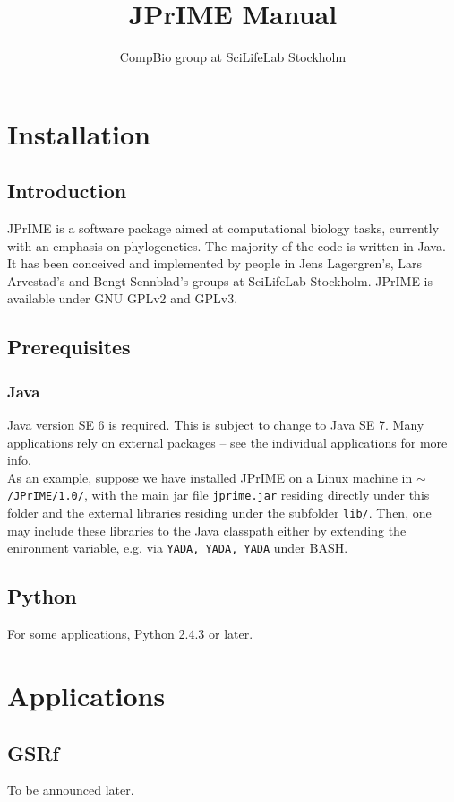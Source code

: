 \documentclass[]{report}   %
\begin{document}
\title{JPrIME Manual}   %
\author{CompBio group at SciLifeLab Stockholm}         %
\date{}    %
\maketitle


\chapter{Installation}
\section{Introduction}
JPrIME is a software package aimed at computational biology tasks, currently with an emphasis on phylogenetics.
The majority of the code is written in Java. It has been conceived and implemented by people in Jens Lagergren's, Lars
Arvestad's and Bengt Sennblad's groups at SciLifeLab Stockholm. JPrIME is available under GNU GPLv2 and GPLv3.
\section{Prerequisites}
\subsection{Java}
Java version SE 6 is required. This is subject to change to Java SE 7. Many applications rely on external packages -- see the individual
applications for more info.
\\
As an example, suppose we have installed JPrIME on a Linux machine in \texttt{$\sim$/JPrIME/1.0/}, with the main jar file \texttt{jprime.jar} residing directly
under this folder and the external libraries residing under the subfolder \texttt{lib/}. Then, one may include these libraries to the Java classpath either by extending
the enironment variable, e.g. via \texttt{YADA, YADA, YADA} under BASH.

\section{Python}
For some applications, Python 2.4.3 or later.

\chapter{Applications}
\section{GSRf}
To be announced later.

\end{document}
